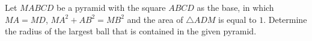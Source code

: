 Let $MABCD$ be a pyramid with the square $ABCD$ as the base, in which $MA=MD$, $MA^2+AB^2=MB^2$ and the area of $\triangle ADM$ is equal to $1$. Determine the radius of the largest ball that is contained in the given pyramid.